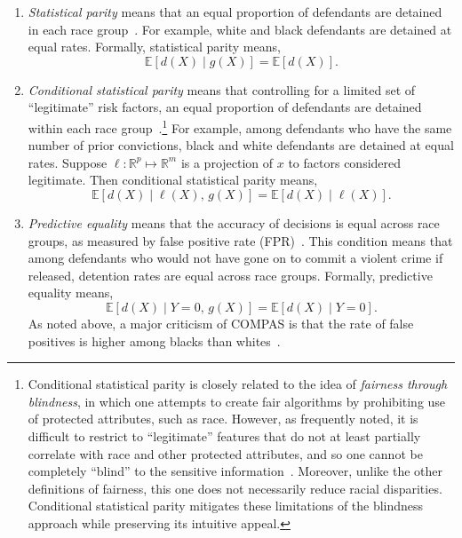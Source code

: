\documentclass[sigconf]{acmart}
\newcommand{\EE}{\mathbb{E}}
\newcommand{\RR}{\mathbb{R}}
\begin{document}
\begin{enumerate}
\item \emph{Statistical parity} means that an equal proportion of 
defendants are detained in each race group~\cite{kamishima2012,feldman2015,zemel2013,fish16}.
For example, white and black defendants are detained at equal rates. 
Formally, statistical parity means,
\begin{equation}
\EE[ d(X) \mid g(X) ] = \EE[ d(X) ].
\end{equation}

\item \emph{Conditional statistical parity} means that controlling for a limited set of ``legitimate'' risk factors, an equal proportion of defendants are detained within each race group~\cite{kamiran2013,dwork2012}.\footnote{%
Conditional statistical parity is closely related to the idea of \emph{fairness through blindness},
in which one attempts to create fair algorithms by prohibiting use of protected attributes, such as race. 
However, as frequently noted, it is difficult to restrict to ``legitimate'' features that do not at least partially correlate 
with race and other protected attributes, and so one
cannot be completely ``blind'' to the sensitive information~\cite{dwork2012}.
Moreover, unlike the other definitions of fairness,
this one does not necessarily reduce racial disparities. 
Conditional statistical parity mitigates these limitations
of the blindness approach while preserving its intuitive appeal.
}
For example, among defendants who have the same number of prior convictions, black and white defendants are detained at equal rates.  
Suppose $\ell : \RR^p \mapsto \RR^m$ is a projection of $x$ to factors considered legitimate. Then conditional statistical parity means,
\begin{equation}
\EE[ d(X) \mid \ell(X), \, g(X)] = \EE[ d(X) \mid \ell(X)].
\end{equation}

\item \emph{Predictive equality} means that the accuracy of decisions is equal across race groups, as measured by false positive rate (FPR)~\cite{hardt2016,zafar2016fairness,kleinberg2016inherent}. This condition means that among defendants who would not have gone on to commit a violent crime if released, detention rates are equal across race groups. Formally, predictive equality means,
\begin{equation}
\EE[ d(X) \mid Y=0, \, g(X)] = \EE[ d(X) \mid Y=0].
\end{equation}
As noted above, a major criticism of COMPAS is that the rate of false positives is higher among blacks than whites~\cite{angwin2016}.
\end{enumerate}
\end{document}
